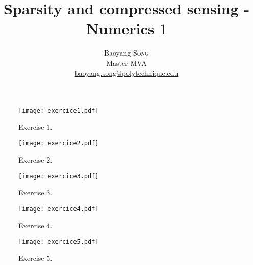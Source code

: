 \documentclass[a4paper,11pt]{article}
\title{Sparsity and compressed sensing - Numerics $1$}
\author{Baoyang \textsc{Song} \\ 
    Master MVA\\
\href{baoyang.song@polytechnique.edu}{baoyang.song@polytechnique.edu}}
\begin{document}
\maketitle

\begin{figure}[htbp!]
    \centering
    \texttt{[image: exercice1.pdf]}
    \caption{Exercise $1$.}
\end{figure}
\begin{figure}[htbp!]
    \centering
    \texttt{[image: exercice2.pdf]}
    \caption{Exercise $2$.}
\end{figure}
\begin{figure}[htbp!]
    \centering
    \texttt{[image: exercice3.pdf]}
    \caption{Exercise $3$.}
\end{figure}
\begin{figure}[htbp!]
    \centering
    \texttt{[image: exercice4.pdf]}
    \caption{Exercise $4$.}
\end{figure}
\begin{figure}[htbp!]
    \centering
    \texttt{[image: exercice5.pdf]}
    \caption{Exercise $5$.}
\end{figure}
\end{document}

